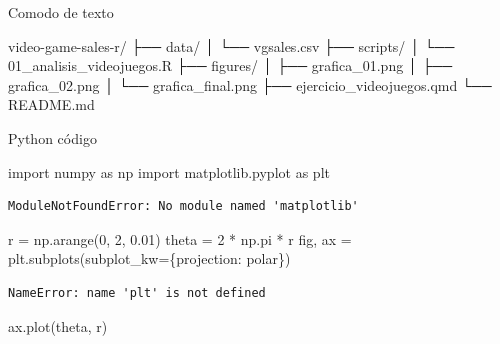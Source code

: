 \documentclass[
  spanish,
  12pt,
  letterpaper,
  DIV=11,
  numbers=noendperiod]{scrreprt}
\newenvironment{Shaded}{\begin{snugshade}}{\end{snugshade}}
\newcommand{\DecValTok}[1]{\textcolor[rgb]{0.68,0.00,0.00}{#1}}
\newcommand{\FloatTok}[1]{\textcolor[rgb]{0.68,0.00,0.00}{#1}}
\newcommand{\ImportTok}[1]{\textcolor[rgb]{0.00,0.46,0.62}{#1}}
\newcommand{\NormalTok}[1]{\textcolor[rgb]{0.00,0.23,0.31}{#1}}
\newcommand{\OperatorTok}[1]{\textcolor[rgb]{0.37,0.37,0.37}{#1}}
\newcommand{\StringTok}[1]{\textcolor[rgb]{0.13,0.47,0.30}{#1}}
\begin{document}
Comodo de texto

\begin{Shaded}
\begin{Highlighting}[]
\NormalTok{video{-}game{-}sales{-}r/}
\NormalTok{├── data/}
\NormalTok{│   └── vgsales.csv}
\NormalTok{├── scripts/}
\NormalTok{│   └── 01\_analisis\_videojuegos.R}
\NormalTok{├── figures/}
\NormalTok{│   ├── grafica\_01.png}
\NormalTok{│   ├── grafica\_02.png}
\NormalTok{│   └── grafica\_final.png}
\NormalTok{├── ejercicio\_videojuegos.qmd}
\NormalTok{└── README.md}
\end{Highlighting}
\end{Shaded}

Python código

\begin{Shaded}
\begin{Highlighting}[]
\ImportTok{import}\NormalTok{ numpy }\ImportTok{as}\NormalTok{ np}
\ImportTok{import}\NormalTok{ matplotlib.pyplot }\ImportTok{as}\NormalTok{ plt}
\end{Highlighting}
\end{Shaded}

\begin{verbatim}
ModuleNotFoundError: No module named 'matplotlib'
\end{verbatim}

\begin{Shaded}
\begin{Highlighting}[]
\NormalTok{r }\OperatorTok{=}\NormalTok{ np.arange(}\DecValTok{0}\NormalTok{, }\DecValTok{2}\NormalTok{, }\FloatTok{0.01}\NormalTok{)}
\NormalTok{theta }\OperatorTok{=} \DecValTok{2} \OperatorTok{*}\NormalTok{ np.pi }\OperatorTok{*}\NormalTok{ r}
\NormalTok{fig, ax }\OperatorTok{=}\NormalTok{ plt.subplots(subplot\_kw}\OperatorTok{=}\NormalTok{\{}\StringTok{\textquotesingle{}projection\textquotesingle{}}\NormalTok{: }\StringTok{\textquotesingle{}polar\textquotesingle{}}\NormalTok{\})}
\end{Highlighting}
\end{Shaded}

\begin{verbatim}
NameError: name 'plt' is not defined
\end{verbatim}

\begin{Shaded}
\begin{Highlighting}[]
\NormalTok{ax.plot(theta, r)}
\end{Highlighting}
\end{Shaded}
\end{document}
